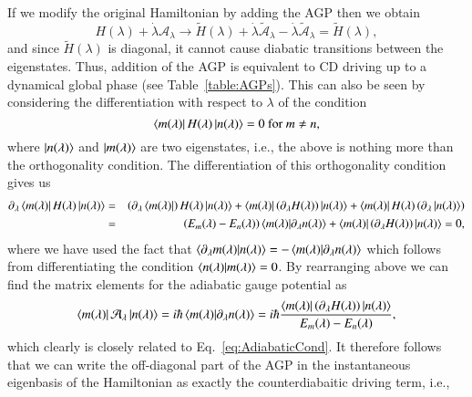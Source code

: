 If we modify the original Hamiltonian by adding the AGP then we obtain 
\begin{equation}
\label{eq:H_tilde}
    H(\lambda) + \dot{\lambda} \mathcal{A}_\lambda \rightarrow \tilde{H}(\lambda) + \dot{\lambda} \tilde{\mathcal{A}}_\lambda - \dot{\lambda} \tilde{\mathcal{A}}_\lambda = \tilde{H}(\lambda),
\end{equation}
and since $\tilde{H}(\lambda)$ is diagonal, it cannot cause diabatic transitions between the eigenstates. Thus, addition of the AGP is equivalent to CD driving up to a dynamical global phase (see Table~\ref{table:AGPs}). This can also be seen by considering the differentiation with respect to $\lambda$ of the condition
\begin{equation}
    \bra{m (\lambda)} H(\lambda) \ket{n(\lambda)} = 0 \text{ for } m \neq n,
\end{equation}
where $\ket{n(\lambda)}$ and $\ket{m(\lambda)}$ are two eigenstates, i.e., the above is nothing more than the orthogonality condition. The differentiation of this orthogonality condition gives us
\begin{eqnarray}
    \partial_\lambda \bra{m (\lambda)} H(\lambda) \ket{n(\lambda)} & = & \left( \partial_\lambda \bra{m (\lambda)} \right) H(\lambda) \ket{n(\lambda)} + \bra{m (\lambda)} \left( \partial_\lambda H(\lambda) \right) \ket{n(\lambda)} + \bra{m (\lambda)} H(\lambda) \left( \partial_\lambda \ket{n(\lambda)} \right) \nonumber \\ & = & \left(E_m(\lambda) - E_n(\lambda)\right) \braket{m (\lambda)}{\partial_\lambda n(\lambda)} + \bra{m (\lambda)} \left( \partial_\lambda H(\lambda) \right) \ket{n(\lambda)} = 0,
\end{eqnarray}
where we have used the fact that $\braket{\partial_\lambda m (\lambda)}{ n(\lambda)} = - \braket{m (\lambda)}{\partial_\lambda n(\lambda)}$ which follows from differentiating the condition $\bra{n(\lambda)}\ket{m(\lambda)}=0$. By rearranging above we can find the matrix elements for the adiabatic gauge potential as 
\begin{equation}
    \bra{m (\lambda)}\mathcal{A}_\lambda\ket{n(\lambda)} = i \hbar \braket{m (\lambda)}{\partial_\lambda n(\lambda)} = i \hbar \frac{\bra{m (\lambda)} \left( \partial_\lambda H(\lambda) \right) \ket{n(\lambda)}}{E_m(\lambda)-E_n(\lambda)},
\end{equation}
which clearly is closely related to Eq.~\eqref{eq:AdiabaticCond}. It therefore follows that we can write the off-diagonal part of the AGP in the instantaneous eigenbasis of the Hamiltonian as exactly the counterdiabaitic driving term, i.e., 
